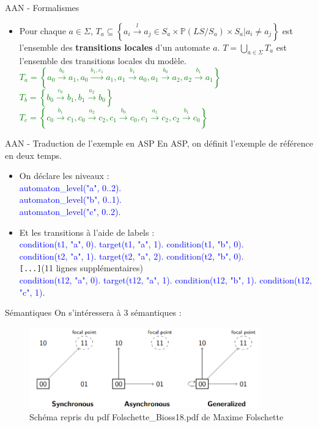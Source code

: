 \documentclass{beamer}
\begin{document}
\begin{frame}{AAN - Formalismes}
	\begin{itemize}
		\pause
		\item Pour chaque $a\in\Sigma$, $T_a\subseteq\left\{a_i\xrightarrow{l}a_j\in S_a\times\mathbb{P}(LS/S_a)\times S_a|a_i\neq a_j\right\}$ est l'ensemble des \textbf{transitions locales} d'un automate $a$. 
		$T=\displaystyle{\bigcup_{a\in\Sigma}}T_a$ est l'ensemble des transitions locales du modèle.
		\pause
		\textcolor{green}{$T_a = \left\{a_0\xrightarrow{b_0}a_1,a_0\xrightarrow{b_1,c_1}a_1,a_1\xrightarrow{b_1}a_0,a_1\xrightarrow{b_0}a_2,a_2\xrightarrow{b_1}a_1\right\}$\\
				  $T_b=\left\{b_0\xrightarrow{c_0}b_1,b_1\xrightarrow{a_2}b_0\right\}$\\
				  $T_c=\left\{c_0\xrightarrow{b_1}c_1,c_0\xrightarrow{a_2}c_2,c_1\xrightarrow{b_0}c_0,c_1\xrightarrow{a_1}c_2,c_2\xrightarrow{b_1}c_0\right\}$}\\
	\end{itemize}
\end{frame}

\begin{frame}{AAN - Traduction de l'exemple en ASP}
	En ASP, on définit l'exemple de référence en deux temps.\\
	\begin{itemize}
		\pause
		\item On déclare les niveaux : \\
			\textcolor{blue}{
			automaton\_level("a", 0..2).\\
			automaton\_level("b", 0..1).\\
			automaton\_level("c", 0..2).\\
			}
		\pause
		\item Et les transitions à l'aide de labels : \\
			\textcolor{blue}{
			condition(t1, "a", 0). target(t1, "a", 1). condition(t1, "b", 0).\\
			condition(t2, "a", 1). target(t2, "a", 2). condition(t2, "b", 0).}\\
			\verb![...]!(11 lignes supplémentaires)\\
			\textcolor{blue}{condition(t12, "a", 0). target(t12, "a", 1). condition(t12, "b", 1). condition(t12, "c", 1).\\
			}
	\end{itemize}
\end{frame}

\begin{frame}{Sémantiques}
	\pause
	On s'intéressera à 3 sémantiques : 
	\begin{figure}[!h]
		\pause
		\includegraphics[width=10cm]{Screenshot.png}
		\caption{Schéma repris du pdf Folschette\_Bioss18.pdf de Maxime Folschette}
	\end{figure}
\end{frame}
\end{document}
